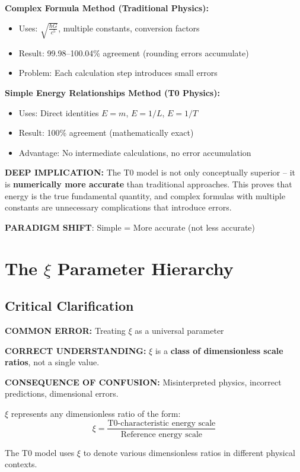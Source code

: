 \documentclass[12pt,a4paper]{article}
\begin{document}
\begin{tcolorbox}[colback=blue!5!white,colframe=blue!75!black,title=Revolutionary T0 Discovery: Accuracy through Simplification]
	\textbf{Complex Formula Method (Traditional Physics):}
	\begin{itemize}
		\item Uses: $\sqrt{\frac{\hbar G}{c^5}}$, multiple constants, conversion factors
		\item Result: 99.98–100.04\% agreement (rounding errors accumulate)
		\item Problem: Each calculation step introduces small errors
	\end{itemize}
	
	\textbf{Simple Energy Relationships Method (T0 Physics):}
	\begin{itemize}
		\item Uses: Direct identities $E = m$, $E = 1/L$, $E = 1/T$
		\item Result: 100\% agreement (mathematically exact)
		\item Advantage: No intermediate calculations, no error accumulation
	\end{itemize}
	
	\textbf{DEEP IMPLICATION:}
	The T0 model is not only conceptually superior – it is \textbf{numerically more accurate} than traditional approaches. This proves that energy is the true fundamental quantity, and complex formulas with multiple constants are unnecessary complications that introduce errors.
	
	\textbf{PARADIGM SHIFT}: Simple = More accurate (not less accurate)
\end{tcolorbox}

\section{The $\xi$ Parameter Hierarchy}

\subsection{Critical Clarification}

\begin{tcolorbox}[colback=red!10!white,colframe=red!75!black,title=CRITICAL WARNING: $\xi$ Parameter Confusion]
	\textbf{COMMON ERROR:} Treating $\xi$ as a universal parameter
	
	\textbf{CORRECT UNDERSTANDING:} $\xi$ is a \textbf{class of dimensionless scale ratios}, not a single value.
	
	\textbf{CONSEQUENCE OF CONFUSION:} Misinterpreted physics, incorrect predictions, dimensional errors.
	
	$\xi$ represents any dimensionless ratio of the form:
	\begin{equation}
		\xi = \frac{\text{T0-characteristic energy scale}}{\text{Reference energy scale}}
	\end{equation}
	
	The T0 model uses $\xi$ to denote various dimensionless ratios in different physical contexts.
\end{tcolorbox}
\end{document}
